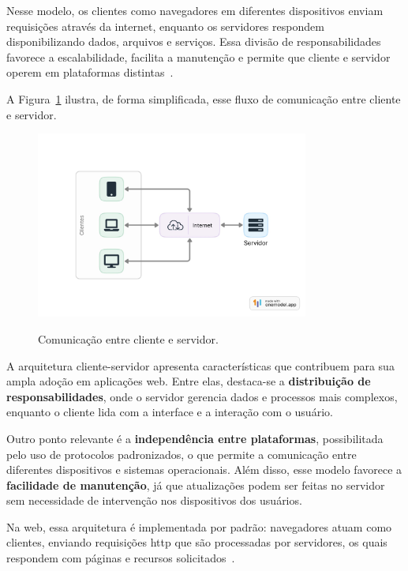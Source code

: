Nesse modelo, os clientes como navegadores em diferentes dispositivos enviam requisições através da internet, enquanto os servidores respondem disponibilizando dados, arquivos e serviços. Essa divisão de responsabilidades favorece a escalabilidade, facilita a manutenção e permite que cliente e servidor operem em plataformas distintas~\cite{fundamentosDevWeb}.

A Figura~\ref{fig:cliente-servidor} ilustra, de forma simplificada, esse fluxo de comunicação entre cliente e servidor.

\begin{figure}[H]
  \centering
  \caption{Comunicação entre cliente e servidor.}
  \includegraphics[width=0.8\textwidth]{media/cliente_servidor.jpeg}
  \label{fig:cliente-servidor}
\end{figure}


A arquitetura cliente-servidor apresenta características que contribuem para sua ampla adoção em aplicações web. Entre elas, destaca-se a \textbf{distribuição de responsabilidades}, onde o servidor gerencia dados e processos mais complexos, enquanto o cliente lida com a interface e a interação com o usuário. 

Outro ponto relevante é a \textbf{independência entre plataformas}, possibilitada pelo uso de protocolos padronizados, o que permite a comunicação entre diferentes dispositivos e sistemas operacionais. Além disso, esse modelo favorece a \textbf{facilidade de manutenção}, já que atualizações podem ser feitas no servidor sem necessidade de intervenção nos dispositivos dos usuários.

Na web, essa arquitetura é implementada por padrão: navegadores atuam como clientes, enviando requisições \acrshort{http} que são processadas por servidores, os quais respondem com páginas e recursos solicitados~\cite{fundamentosDevWeb}.


